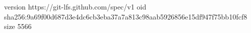 version https://git-lfs.github.com/spec/v1
oid sha256:9a69f00d687d3e4dc6cb3eba37a7a813c98aab5926856e15df947f75bb10fcf8
size 5566
